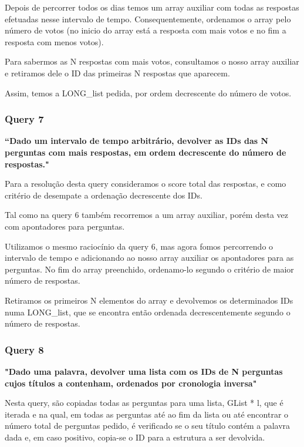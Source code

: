 \documentclass[a4paper]{article}
\begin{document}
Depois de percorrer todos os dias temos um array auxiliar com todas as respostas
efetuadas nesse intervalo de tempo. Consequentemente, ordenamos o array pelo número
de votos (no inicio do array está a resposta com mais votos e no fim a resposta
com menos votos).

Para sabermos as N respostas com mais votos, consultamos o nosso array auxiliar
e retiramos dele o ID das primeiras N respostas que aparecem.

Assim, temos a LONG\_list pedida, por ordem decrescente do número de votos.

\subsubsection*{Query 7}
\label{sec:query7}

\textbf{“Dado um intervalo de tempo arbitrário, devolver as IDs das N perguntas
com mais respostas, em ordem decrescente do número de respostas."}

Para a resolução desta query consideramos o score total das respostas, e como
critério de desempate a ordenação decrescente dos IDs.

Tal como na query 6 também recorremos a um array auxiliar, porém
desta vez com apontadores para perguntas.

Utilizamos o mesmo raciocínio da query 6, mas agora fomos percorrendo o intervalo
de tempo e adicionando ao nosso array auxiliar os apontadores para as perguntas.
No fim do array preenchido, ordenamo-lo segundo o critério de maior número de respostas.

Retiramos os primeiros N elementos do array e devolvemos os determinados IDs
numa LONG\_list, que se encontra então ordenada decrescentemente segundo o número de respostas.

\subsubsection*{Query 8}
\label{sec:query8}

\textbf{"Dado uma palavra, devolver uma lista com os IDs de
N perguntas cujos títulos a contenham, ordenados por cronologia inversa"}

Nesta query, são copiadas todas as perguntas para uma lista, GList * l, que é iterada
e na qual, em todas as perguntas até ao fim da lista ou até encontrar o número total de
perguntas pedido, é verificado se o seu título contém a palavra dada e, em caso positivo,
copia-se o ID para a estrutura a ser devolvida.
\end{document}
